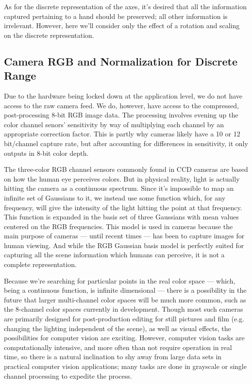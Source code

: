 As for the discrete representation of the axes, it's desired that all the information captured pertaining to a hand should be preserved; all other information is irrelevant. However, here we'll consider only the effect of a rotation and scaling on the discrete representation.


\subsection{Camera RGB and Normalization for Discrete Range}\label{sec:CameraRGB}

Due to the hardware being locked down at the application level, we do not have access to the raw camera feed. We do, however, have access to the compressed, post-processing 8-bit RGB image data. The processing involves evening up the color channel senors' sensitivity by way of multiplying each channel by an appropriate correction factor. This is partly why cameras likely have a 10 or 12 bit/channel capture rate, but after accounting for differences in sensitivity, it only outputs in 8-bit color depth.

The three-color RGB channel sensors commonly found in CCD cameras are based on how the human eye perceives colors. But in physical reality, light is actually hitting the camera as a continuous spectrum. Since it's impossible to map an infinite set of Gaussians to it, we instead use some function which, for any frequency, will give the intensity of the light hitting the point at that frequency. This function is expanded in the basis set of three Gaussians with mean values centered on the RGB frequencies. This model is used in cameras because the main purpose of cameras --- until recent times --- has been to capture images for human viewing. And while the RGB Gaussian basis model is perfectly suited for capturing all the scene information which humans can perceive, it is not a complete representation.

Because we're searching for particular points in the real color space --- which, being a continuous function, is infinite dimensional --- there is a possibility in the future that larger multi-channel color spaces will be much more common, such as the 8-channel color spaces currently in development. Though most such cameras are primarily designed for post-production editing for still pictures and film (e.g. changing the lighting independent of the scene), as well as visual effects, the possibilities for computer vision are exciting. However, computer vision tasks are computationally intensive, and more often than not require operation in real time, so there is a natural inclination to shy away from large data sets in practical computer vision applications; many tasks are done in grayscale or single channel processing to expedite the process.

